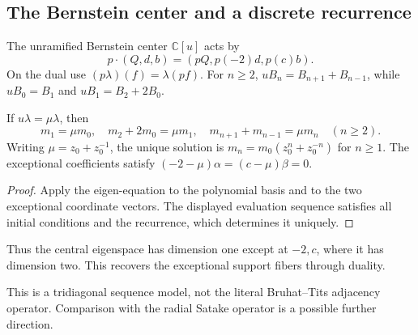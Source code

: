 \subsection{The Bernstein center and a discrete recurrence}
The unramified Bernstein center $\mathbb C[u]$ acts by
\[
p\cdot(Q,d,b)=(pQ,p(-2)d,p(c)b).
\]
On the dual use $(p\lambda)(f)=\lambda(pf)$. For $n\ge2$, $uB_n=B_{n+1}+B_{n-1}$, while $uB_0=B_1$ and $uB_1=B_2+2B_0$.
\begin{theorem}\label{thm:duality-eigen}
If $u\lambda=\mu\lambda$, then
\[
m_1=\mu m_0,\quad m_2+2m_0=\mu m_1,\quad
m_{n+1}+m_{n-1}=\mu m_n\quad(n\ge2).
\]
Writing $\mu=z_0+z_0^{-1}$, the unique solution is $m_n=m_0(z_0^n+z_0^{-n})$ for $n\ge1$. The exceptional coefficients satisfy $(-2-\mu)\alpha=(c-\mu)\beta=0$.
\end{theorem}
\begin{proof}
Apply the eigen-equation to the polynomial basis and to the two exceptional coordinate vectors. The displayed evaluation sequence satisfies all initial conditions and the recurrence, which determines it uniquely.
\end{proof}
Thus the central eigenspace has dimension one except at $-2,c$, where it has dimension two. This recovers the exceptional support fibers through duality.
\begin{center}
\end{center}
This is a tridiagonal sequence model, not the literal Bruhat--Tits adjacency operator. Comparison with the radial Satake operator is a possible further direction.

